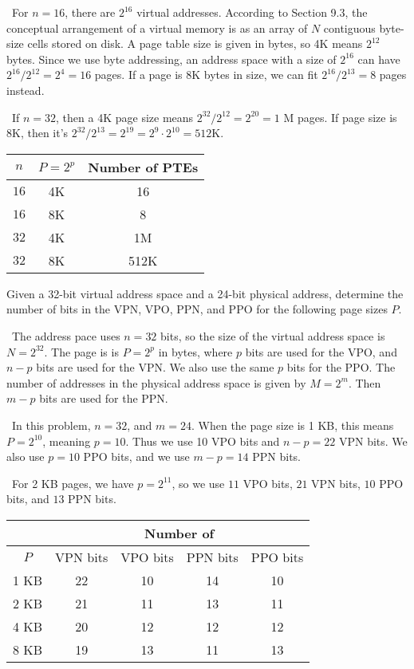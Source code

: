 \documentclass[12pt]{article}
\newenvironment{ex}[2][Exercise]{\begin{trivlist}
		\item[\hskip \labelsep {\bfseries #1}\hskip \labelsep {\bfseries #2.}]}{\end{trivlist}}
\newenvironment{sol}[1][Solution]{\begin{trivlist}
		\item[\hskip \labelsep {\bfseries #1:}]}{\end{trivlist}}
\begin{document}
\begin{sol}
	\
	For $n=16$, there are $2^{16}$ virtual addresses. According to Section 9.3, the conceptual
	arrangement of a virtual memory is as an array of $N$ contiguous byte-size cells stored on disk.
	A page table size is given in bytes, so 4K means $2^{12}$ bytes. Since we use byte addressing,
	an address space with a size of $2^{16}$ can have $2^{16}/2^{12}=2^{4}=16$ pages. If a page is 8K
	bytes in size, we can fit $2^{16}/2^{13}=8$ pages instead.
	
	\
	If $n=32$, then a 4K page size means $2^{32}/2^{12}=2^{20}=1$ M pages. If page size is
	8K, then it's $2^{32}/2^{13}=2^{19}=2^{9}\cdot 2^{10}=512$K.
	\begin{center}
		\begin{tabular}{ccc}
			$n$ & $P=2^p$ & Number of PTEs\\
			\hline
			$16$ & 4K & 16\\
			$16$ & 8K & 8\\
			$32$ & 4K & 1M\\
			$32$ & 8K & 512K
		\end{tabular}
	\end{center}
\end{sol}

\begin{ex}{9.3}
	Given a 32-bit virtual address space and a 24-bit physical address, determine the number of
	bits in the VPN, VPO, PPN, and PPO for the following page sizes $P$.
\end{ex}

\begin{sol}
	\
	The address pace uses $n=32$ bits, so the size of the virtual address space is $N=2^{32}$.
	The page is is $P=2^{p}$ in bytes, where $p$ bits are used for the VPO, and $n-p$ bits
	are used for the VPN. We also use the same $p$ bits for the PPO. The number of addresses
	in the physical address space is given by $M=2^m$. Then $m-p$ bits are used for the PPN.
	
	\
	In this problem, $n=32$, and $m=24$. When the page size is 1 KB, this means $P=2^{10}$,
	meaning $p=10$. Thus we use 10 VPO bits and $n-p=22$ VPN bits. We also use $p=10$ PPO bits,
	and we use $m-p=14$ PPN bits.
	
	\
	For 2 KB pages, we have $p=2^{11}$, so we use $11$ VPO bits, $21$ VPN bits, $10$ PPO bits,
	and $13$ PPN bits.
	\begin{center}
		\begin{tabular}{ccccc}
			{} & \multicolumn{4}{c}{Number of}\\
			\hline
			$P$ & VPN bits & VPO bits & PPN bits & PPO bits\\
			\hline
			1 KB & 22 & 10 & 14 & 10\\
			2 KB & 21 & 11 & 13 & 11\\
			4 KB & 20 & 12 & 12 & 12\\
			8 KB & 19 & 13 & 11 & 13
		\end{tabular}
	\end{center}
\end{sol}
\end{document}
